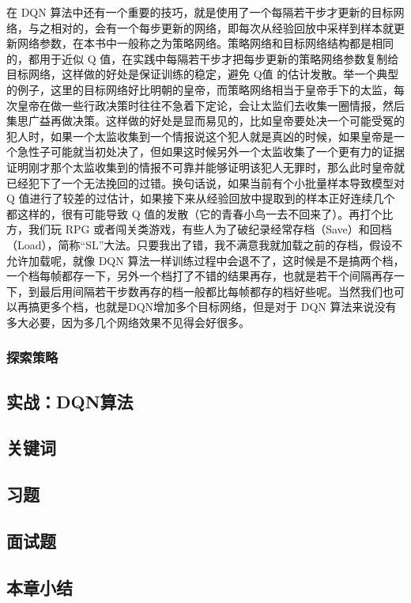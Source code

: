 在 DQN 算法中还有一个重要的技巧，就是使用了一个每隔若干步才更新的目标网络，与之相对的，会有一个每步更新的网络，即每次从经验回放中采样到样本就更新网络参数，在本书中一般称之为策略网络。策略网络和目标网络结构都是相同的，都用于近似 Q 值，在实践中每隔若干步才把每步更新的策略网络参数复制给目标网络，这样做的好处是保证训练的稳定，避免 Q值 的估计发散。举一个典型的例子，这里的目标网络好比明朝的皇帝，而策略网络相当于皇帝手下的太监，每次皇帝在做一些行政决策时往往不急着下定论，会让太监们去收集一圈情报，然后集思广益再做决策。这样做的好处是显而易见的，比如皇帝要处决一个可能受冤的犯人时，如果一个太监收集到一个情报说这个犯人就是真凶的时候，如果皇帝是一个急性子可能就当初处决了，但如果这时候另外一个太监收集了一个更有力的证据证明刚才那个太监收集到的情报不可靠并能够证明该犯人无罪时，那么此时皇帝就已经犯下了一个无法挽回的过错。换句话说，如果当前有个小批量样本导致模型对 Q 值进行了较差的过估计，如果接下来从经验回放中提取到的样本正好连续几个都这样的，很有可能导致 Q 值的发散（它的青春小鸟一去不回来了）。再打个比方，我们玩 RPG 或者闯关类游戏，有些人为了破纪录经常存档（Save）和回档（Load），简称“SL”大法。只要我出了错，我不满意我就加载之前的存档，假设不允许加载呢，就像 DQN 算法一样训练过程中会退不了，这时候是不是搞两个档，一个档每帧都存一下，另外一个档打了不错的结果再存，也就是若干个间隔再存一下，到最后用间隔若干步数再存的档一般都比每帧都存的档好些呢。当然我们也可以再搞更多个档，也就是DQN增加多个目标网络，但是对于 DQN 算法来说没有多大必要，因为多几个网络效果不见得会好很多。


\subsubsection{探索策略}
\subsection{实战：DQN算法}
\subsection{关键词}
\subsection{习题}
\subsection{面试题}
\subsection{本章小结}